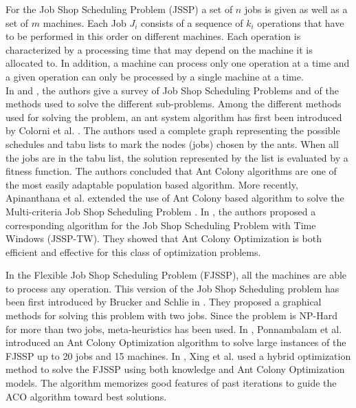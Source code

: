 \documentclass[a4paper,10pt]{article}
\begin{document}
For the Job Shop Scheduling Problem (JSSP) a set of $n$ jobs is given as well as a set of $m$ machines. Each Job $J_i$ consists of a sequence of $k_i$ operations that have to be performed in this order on different machines. Each operation is characterized by a processing time that may depend on the machine it is allocated to. In addition, a machine can process only one operation at a time and a given operation can only be processed by a single machine at a time. \\

In \cite{Jain1999} and \cite{Brucker2010}, the authors give a survey of Job Shop Scheduling Problems and of the methods used to solve the different sub-problems.
Among the different methods used for solving the problem, an ant system algorithm has first been introduced by Colorni et al. \cite{Colorni1994}. The authors used a complete graph representing the possible schedules and tabu lists to mark the nodes (jobs) chosen by the ants. When all the jobs are in the tabu list, the solution represented by the list is evaluated by a fitness function. The authors concluded that Ant Colony algorithms are one of the most easily adaptable population based algorithm. More recently, Apinanthana et al. extended the use of Ant Colony based algorithm to solve the Multi-criteria Job Shop Scheduling Problem \cite{Apinanthana2011}.
In \cite{Huang2008}, the authors proposed a corresponding algorithm for the Job Shop Scheduling Problem with Time Windows (JSSP-TW). They showed that Ant Colony Optimization is both efficient and effective for this class of optimization problems.

In the Flexible Job Shop Scheduling Problem (FJSSP), all the machines are able to process any operation. This version of the Job Shop Scheduling problem has been first introduced by Brucker and Schlie in \cite{Brucker1990}. They proposed a graphical methods for solving this problem with two jobs. Since the problem is NP-Hard for more than two jobs, meta-heuristics has been used. In \cite{Ponnambalam2005}, Ponnambalam et al. introduced an Ant Colony Optimization algorithm to solve large instances of the FJSSP up to 20 jobs and 15 machines. In \cite{Xing2010}, Xing et al. used a hybrid optimization method to solve the FJSSP using both knowledge and Ant Colony Optimization models. The algorithm memorizes good features of past iterations to guide the ACO algorithm toward best solutions.
\end{document}
